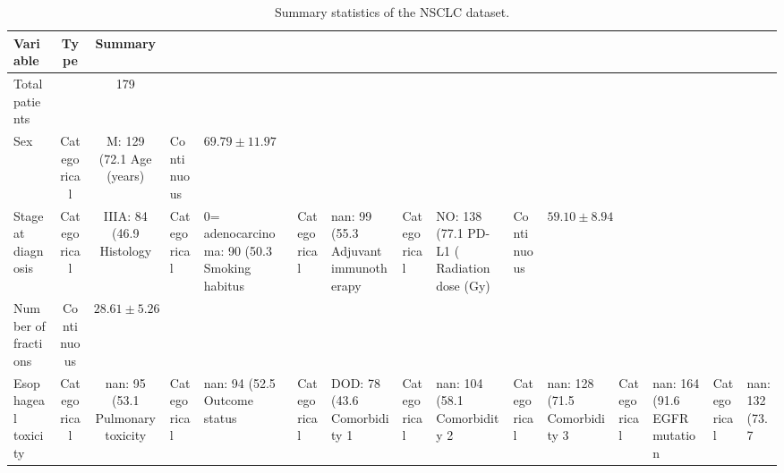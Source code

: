 \begin{table}[!ht]
\centering
\small
\caption{Summary statistics of the NSCLC dataset.}
\begin{tabular}{lcc}
\toprule
Variable & Type & Summary \\
\midrule
Total patients &  & 179 \\
Sex & Categorical & M: 129 (72.1%
Age (years) & Continuous & $69.79 \pm 11.97$ \\
Stage at diagnosis & Categorical & IIIA: 84 (46.9%
Histology & Categorical & 0= adenocarcinoma: 90 (50.3%
Smoking habitus & Categorical & nan: 99 (55.3%
Adjuvant immunotherapy & Categorical & NO: 138 (77.1%
PD-L1 (%
Radiation dose (Gy) & Continuous & $59.10 \pm 8.94$ \\
Number of fractions & Continuous & $28.61 \pm 5.26$ \\
Esophageal toxicity & Categorical & nan: 95 (53.1%
Pulmonary toxicity & Categorical & nan: 94 (52.5%
Outcome status & Categorical & DOD: 78 (43.6%
Comorbidity 1 & Categorical & nan: 104 (58.1%
Comorbidity 2 & Categorical & nan: 128 (71.5%
Comorbidity 3 & Categorical & nan: 164 (91.6%
EGFR mutation & Categorical & nan: 132 (73.7%

\end{tabular}
\end{table}
